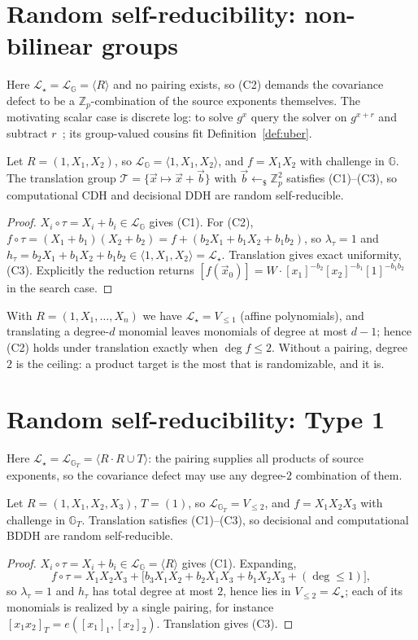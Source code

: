 \documentclass{conjura-solution}
\newcommand{\G}{\mathbb{G}}
\newcommand{\GT}{\mathbb{G}_T}
\newcommand{\Zp}{\mathbb{Z}_p}
\newcommand{\vx}{\vec{x}}
\newcommand{\vb}{\vec{b}}
\newcommand{\LL}{\mathcal{L}}
\newcommand{\Span}[1]{\langle #1 \rangle} %
\newcommand{\rsample}{\leftarrow_{\$}}
\begin{document}
\section{Random self-reducibility: non-bilinear groups}
\label{sec:nonbilinear}

Here $\LL_\star=\LL_{\G}=\Span{R}$ and no pairing exists, so (C2) demands the covariance
defect to be a $\Zp$-combination of the source exponents themselves. The motivating
scalar case is discrete log: to solve $g^{x}$ query the solver on $g^{x+r}$ and subtract
$r$~\cite{TW87}; its group-valued cousins fit Definition~\ref{def:uber}.

\begin{proposition}
\label{prop:cdh}
Let $R=(1,X_1,X_2)$, so $\LL_{\G}=\Span{1,X_1,X_2}$, and $f=X_1X_2$ with challenge in $\G$.
The translation group $\mathcal T=\{\vx\mapsto\vx+\vb\}$ with $\vb\rsample\Zp^{2}$ satisfies
\textup{(C1)--(C3)}, so computational CDH and decisional DDH are random self-reducible.
\end{proposition}
\begin{proof}
$X_i\circ\tau=X_i+b_i\in\LL_{\G}$ gives (C1). For (C2),
$f\circ\tau=(X_1+b_1)(X_2+b_2)=f+(b_2X_1+b_1X_2+b_1b_2)$, so $\lambda_\tau=1$ and
$h_\tau=b_2X_1+b_1X_2+b_1b_2\in\Span{1,X_1,X_2}=\LL_\star$. Translation gives exact
uniformity, (C3). Explicitly the reduction returns
$[f(\vx_0)]=W\cdot[x_1]^{-b_2}[x_2]^{-b_1}[1]^{-b_1b_2}$ in the search case.
\end{proof}

With $R=(1,X_1,\dots,X_n)$ we have $\LL_\star=V_{\le 1}$ (affine polynomials), and
translating a degree-$d$ monomial leaves monomials of degree at most $d-1$; hence (C2)
holds under translation exactly when $\deg f\le 2$. Without a pairing, degree $2$ is the
ceiling: a product target is the most that is randomizable, and it is.

\section{Random self-reducibility: Type 1}

Here $\LL_\star=\LL_{\GT}=\Span{R\cdot R\cup T}$: the pairing supplies all products of source
exponents, so the covariance defect may use any degree-$2$ combination of them.

\begin{proposition}[BDDH]
\label{prop:bddh}
Let $R=(1,X_1,X_2,X_3)$, $T=(1)$, so $\LL_{\GT}=V_{\le 2}$, and $f=X_1X_2X_3$ with challenge
in $\GT$. Translation satisfies \textup{(C1)--(C3)}, so decisional and computational BDDH are
random self-reducible.
\end{proposition}
\begin{proof}
$X_i\circ\tau=X_i+b_i\in\LL_{\G}=\Span{R}$ gives (C1). Expanding,
\[
  f\circ\tau=X_1X_2X_3+\bigl[b_3X_1X_2+b_2X_1X_3+b_1X_2X_3+(\deg\le 1)\bigr],
\]
so $\lambda_\tau=1$ and $h_\tau$ has total degree at most $2$, hence lies in
$V_{\le 2}=\LL_\star$; each of its monomials is realized by a single pairing, for instance
$[x_1x_2]_T=e([x_1]_1,[x_2]_2)$. Translation gives (C3).
\end{proof}
\end{document}
